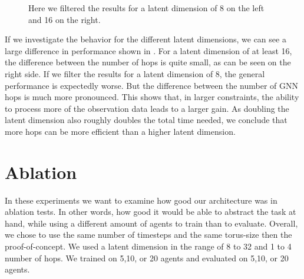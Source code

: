 \begin{figure}[htp]
    \centering
    \hspace{1cm}                       
    \caption{Here we filtered the results for a latent dimension of 8 on the left and 16 on the right.}
    \label{fig:proof_of_concept_rendezvous_ld}
\end{figure}

If we investigate the behavior for the different latent dimensions, we can see a large difference in performance shown in . For a latent dimension of at least 16, the difference between the number of hops is quite small, as can be seen on the right side. If we filter the results for a latent dimension of 8, the general performance is expectedly worse. But the difference between the number of GNN hops is much more pronounced. This shows that, in larger constraints, the ability to process more of the observation data leads to a larger gain. As doubling the latent dimension also roughly doubles the total time needed, we conclude that more hops can be more efficient than a higher latent dimension.


\section{Ablation}
\label{sec:Ablation}
In these experiments we want to examine how good our architecture was in ablation tests. In other words, how good it would be able to abstract the task at hand, while using a different amount of agents to train than to evaluate. Overall, we chose to use the same number of timesteps and the same torus-size then the proof-of-concept. We used a latent dimension in the range of 8 to 32 and 1 to 4 number of hops. We trained on 5,10, or 20 agents and evaluated on 5,10, or 20 agents.

